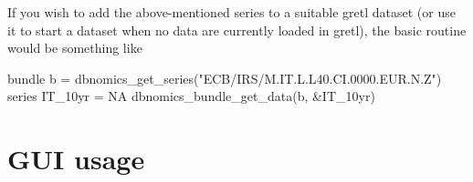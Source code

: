 \documentclass{article}
\begin{document}
If you wish to add the above-mentioned series to a suitable gretl
dataset (or use it to start a dataset when no data are currently
loaded in gretl), the basic routine would be something like
\begin{code}
bundle b = dbnomics_get_series("ECB/IRS/M.IT.L.L40.CI.0000.EUR.N.Z")
series IT_10yr = NA
dbnomics_bundle_get_data(b, &IT_10yr)
\end{code}


\section{GUI usage}
\end{document}
